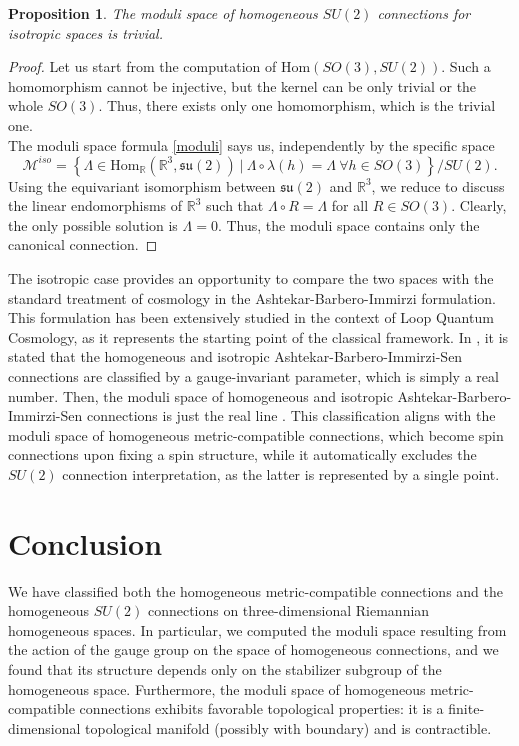 \documentclass{article}
\numberwithin{equation}{section}
\newtheorem{proposition}{Proposition}[section]
\theoremstyle{definition}
\newcommand{\R}{\mathbb{R}}
\newcommand{\su}[1]{\mathfrak{su}(#1)}
\begin{document}
\begin{proposition}
    The moduli space of homogeneous $SU(2)$ connections for isotropic spaces is trivial.
\end{proposition}
\begin{proof}
    Let us start from the computation of $\mathrm{Hom}(SO(3),SU(2))$. Such a homomorphism cannot be injective, but the kernel can be only trivial or the whole $SO(3)$. Thus, there exists only one homomorphism, which is the trivial one.\\
    The moduli space formula \eqref{moduli} says us, independently by the specific space \[\mathcal{M}^{iso}=\left\{\Lambda\in \mathrm{Hom}_{\R}(\R^3,\su{2})\ |\ \Lambda\circ \lambda(h)=\Lambda\ \forall h\in SO(3)\right\}/SU(2).\]
    Using the equivariant isomorphism between $\su{2}$ and $\R^3$, we reduce to discuss the linear endomorphisms of $\R^3$ such that $\Lambda\circ R=\Lambda$ for all $R\in SO(3)$. Clearly, the only possible solution is $\Lambda=0$. Thus, the moduli space contains only the canonical connection.
\end{proof}

The isotropic case provides an opportunity to compare the two spaces with the standard treatment of cosmology in the Ashtekar-Barbero-Immirzi formulation. This formulation has been extensively studied in the context of Loop Quantum Cosmology, as it represents the starting point of the classical framework. In \cite{Ashtekar_Bojowald_Lewandowski_2003}, it is stated that the homogeneous and isotropic Ashtekar-Barbero-Immirzi-Sen connections are classified by a gauge-invariant parameter, which is simply a real number. Then, the moduli space of homogeneous and isotropic Ashtekar-Barbero-Immirzi-Sen connections is just the real line \cite{Brunnemann_Fleischhack_2012}. This classification aligns with the moduli space of homogeneous metric-compatible connections, which become spin connections upon fixing a spin structure, while it automatically excludes the $SU(2)$ connection interpretation, as the latter is represented by a single point.

\section{Conclusion}
We have classified both the homogeneous metric-compatible connections and the homogeneous $SU(2)$ connections on three-dimensional Riemannian homogeneous spaces. In particular, we computed the moduli space resulting from the action of the gauge group on the space of homogeneous connections, and we found that its structure depends only on the stabilizer subgroup of the homogeneous space. Furthermore, the moduli space of homogeneous metric-compatible connections exhibits favorable topological properties: it is a finite-dimensional topological manifold (possibly with boundary) and is contractible.
\end{document}
